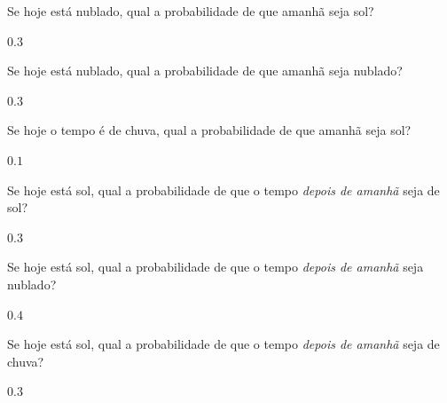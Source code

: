 \documentclass[pdftex, brazil, 12pt, oneside, addpoints]{exam}
\begin{document}
\begin{questions}
\setlength\linefillthickness{0.2pt}

\question
Se hoje está nublado, qual a probabilidade de que amanhã seja sol?
\begin{solutionorlines}[0.25in]
  $0.3$
\end{solutionorlines}

\question
Se hoje está nublado, qual a probabilidade de que amanhã seja nublado?
\begin{solutionorlines}[0.25in]
  $0.3$
\end{solutionorlines}

\question
Se hoje o tempo é de chuva, qual a probabilidade de que amanhã seja
sol?
\begin{solutionorlines}[0.25in]
  $0.1$
\end{solutionorlines}



\question
Se hoje está sol, qual a probabilidade de que o tempo \emph{depois de
  amanhã} seja de sol?
\begin{solutionorlines}[0.25in]
  $0.3$
\end{solutionorlines}

\question
Se hoje está sol, qual a probabilidade de que o tempo \emph{depois de
  amanhã} seja nublado?
\begin{solutionorlines}[0.25in]
  $0.4$
\end{solutionorlines}

\question
Se hoje está sol, qual a probabilidade de que o tempo \emph{depois de
  amanhã} seja de chuva?
\begin{solutionorlines}[0.25in]
  $0.3$
\end{solutionorlines}


\end{questions}
\end{document}

